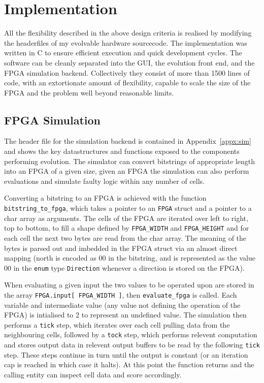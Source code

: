 \section{Implementation}
All the flexibility described in the above design criteria is realised by modifying
the headerfiles of my evolvable hardware sourcecode. The implementation was written
in C to ensure efficient execution and quick development cycles. The software can
be cleanly separated into the GUI, the evolution front end, and the FPGA
simulation backend. Collectively they consist of more than 1500 lines of code, with
an extortionate amount of flexibility, capable to scale the size of the FPGA and the
problem well beyond reasonable limits.

\subsection{FPGA Simulation}
The header file for the simulation backend is contained in Appendix~\ref{appx:sim} and shows the
key datastructures and functions exposed to the components performing evolution.
The simulator can convert bitstrings of appropriate length into an FPGA of a
given size, given an FPGA the simulation can also perform evaluations and
simulate faulty logic within any number of cells.

Converting a bitstring to an FPGA is achieved with the function \texttt{bitstring\_to\_fpga},
which takes a pointer to an \texttt{FPGA} struct and a pointer to a char array as arguments.
The cells of the FPGA are iterated over left to right, top to bottom, to fill a shape defined
by \texttt{FPGA\_WIDTH} and \texttt{FPGA\_HEIGHT} and for each cell the next two
bytes are read from the char array. The meaning of the bytes is parsed out and imbedded
in the FPGA struct via an almost direct mapping (north is encoded as 00 in the bitstring,
and is represented as the value 00 in the \texttt{enum} type \texttt{Direction} whenever
a direction is stored on the FPGA).

When evaluating a given input the two values to be operated upon are stored in
the array \texttt{FPGA.input[ FPGA\_WIDTH ]}, then \texttt{evaluate\_fpga} is called.
Each variable and intermediate value
(any value not defining the operation of the FPGA) is intialised to 2 to represent
an undefined value. The simulation then performs a \texttt{tick} step, which iterates over each
cell pulling data from the neighbouring cells, followed by a \texttt{tock} step, which performs
relevent computation and stores output data in relevent output buffers to be read by
the following \texttt{tick} step. These steps continue in turn
until the output is constant (or an iteration cap is reached in which case it halts).
At this point the function returns and the calling entity can inspect cell data and
score accordingly.

